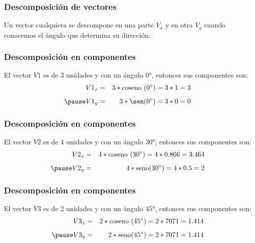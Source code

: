 \documentclass[14pt, xcolor={usenames,dvipsnames}]{beamer}
\begin{document}
\begin{frame}
\frametitle{Descomposición de vectores}
Un vector cualquiera se descompone en una parte $V_{x}$ y en otra $V_{y}$ cuando conocemos el ángulo que determina su dirección:
\begin{figure}
\centering
{}
\end{figure}
\end{frame}
\begin{frame}
\frametitle{Descomposición en componentes}
El vector $V1$ es de 3 unidades y con un ángulo $\ang{0}$, entonces sus componentes son:
\begin{eqnarray*}
V1_{x} &=& 3 * \text{coseno } (\ang{0}) = 3 * 1 =  3  \\[0.5em] \pause
V1_{y} &=& 3 * \sen (\ang{0}) = 3 * 0 =  0
\end{eqnarray*}
\end{frame}
\begin{frame}
\frametitle{Descomposición en componentes}
El vector $V2$ es de 4 unidades y con un ángulo $\ang{30}$, entonces sus componentes son:
\begin{eqnarray*}
V2_{x} &=& 4 * \text{coseno } (\ang{30}) = 4 * 0.866 =  3.464  \\[0.5em] \pause
V2_{y} &=& 4 * \text{seno} (\ang{30}) = 4 * 0.5 =  2
\end{eqnarray*}
\end{frame}
\begin{frame}
\frametitle{Descomposición en componentes}
El vector $V3$ es de 2 unidades y con un ángulo $\ang{45}$, entonces sus componentes son:
\begin{eqnarray*}
V3_{x} &=& 2 * \text{coseno } (\ang{45}) = 2 * 7071 =  1.414  \\[0.5em] \pause
V3_{y} &=& 2 * \text{seno} (\ang{45}) = 2 * 7071 =  1.414
\end{eqnarray*}
\end{frame}
\end{document}
